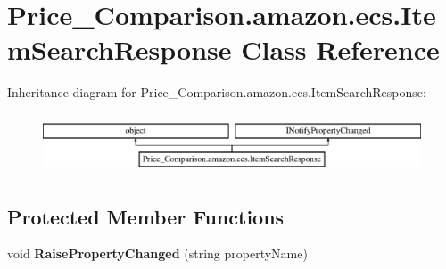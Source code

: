 \hypertarget{class_price___comparison_1_1amazon_1_1ecs_1_1_item_search_response}{\section{Price\-\_\-\-Comparison.\-amazon.\-ecs.\-Item\-Search\-Response Class Reference}
\label{class_price___comparison_1_1amazon_1_1ecs_1_1_item_search_response}
}


 


Inheritance diagram for Price\-\_\-\-Comparison.\-amazon.\-ecs.\-Item\-Search\-Response\-:\begin{figure}[H]
\begin{center}
\leavevmode
\includegraphics[height=1.766562cm]{class_price___comparison_1_1amazon_1_1ecs_1_1_item_search_response}
\end{center}
\end{figure}
\subsection*{Protected Member Functions}
\begin{DoxyCompactItemize}
\item 
\hypertarget{class_price___comparison_1_1amazon_1_1ecs_1_1_item_search_response_a916260f73d7081dd955a38b9bf36887f}{void {\bfseries Raise\-Property\-Changed} (string property\-Name)}\label{class_price___comparison_1_1amazon_1_1ecs_1_1_item_search_response_a916260f73d7081dd955a38b9bf36887f}

\end{DoxyCompactItemize}
